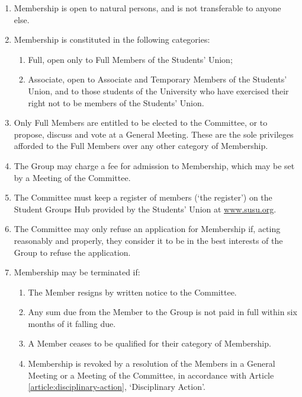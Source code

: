 \documentclass[12pt]{constitution}
\begin{document}
\label{article:membership}

\begin{enumerate}
    \item Membership is open to natural persons, and is not transferable to anyone else.
    \item Membership is constituted in the following categories:
    \begin{enumerate}
        \item Full, open only to Full Members of the Students' Union;
        \item Associate, open to Associate and Temporary Members of the Students' Union, and to those students of the University who have exercised their right not to be members of the Students' Union.
    \end{enumerate}
    \item Only Full Members are entitled to be elected to the Committee, or to propose, discuss and vote at a General Meeting. These are the sole privileges afforded to the Full Members over any other category of Membership.
    \item The Group may charge a fee for admission to Membership, which may be set by a Meeting of the Committee.
    \item The Committee must keep a register of members (`the register') on the Student Groups Hub provided by the Students' Union at \url{www.susu.org}.
    \item The Committee may only refuse an application for Membership if, acting reasonably and properly, they consider it to be in the best interests of the Group to refuse the application.
    \item Membership may be terminated if:
    \begin{enumerate}
        \item The Member resigns by written notice to the Committee.
        \item Any sum due from the Member to the Group is not paid in full within six months of it falling due.
        \item A Member ceases to be qualified for their category of Membership.
        \item Membership is revoked by a resolution of the Members in a General Meeting or a Meeting of the Committee, in accordance with Article \ref{article:disciplinary-action}, `Disciplinary Action'.
    \end{enumerate}
\end{enumerate}
\end{document}
